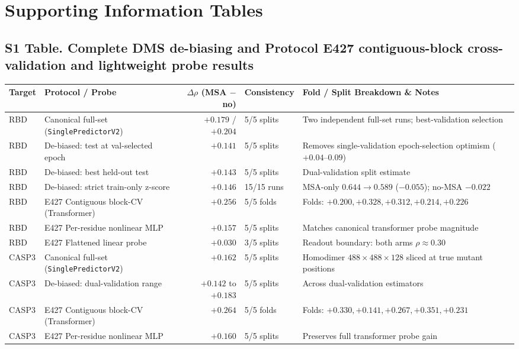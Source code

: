 \documentclass[10pt,a4paper]{article}
\begin{document}
\newpage
\section*{Supporting Information Tables}

\subsection*{S1 Table. Complete DMS de-biasing and Protocol E427 contiguous-block cross-validation and lightweight probe results}
\begin{table}[!ht]
\centering
\footnotesize
\begin{tabularx}{\textwidth}{l l r l Y}
\toprule
\textbf{Target} & \textbf{Protocol / Probe} & \textbf{$\Delta\rho$ (MSA $-$ no)} & \textbf{Consistency} & \textbf{Fold / Split Breakdown \& Notes} \\
\midrule
RBD & Canonical full-set (\texttt{SinglePredictorV2}) & $+0.179$ / $+0.204$ & 5/5 splits & Two independent full-set runs; best-validation selection \\
RBD & De-biased: test at val-selected epoch & $+0.141$ & 5/5 splits & Removes single-validation epoch-selection optimism ($+0.04$--$0.09$) \\
RBD & De-biased: best held-out test & $+0.143$ & 5/5 splits & Dual-validation split estimate \\
RBD & De-biased: strict train-only z-score & $+0.146$ & 15/15 runs & MSA-only $0.644 \rightarrow 0.589$ ($-0.055$); no-MSA $-0.022$ \\
RBD & E427 Contiguous block-CV (Transformer) & $+0.256$ & 5/5 folds & Folds: $+0.200, +0.328, +0.312, +0.214, +0.226$ \\
RBD & E427 Per-residue nonlinear MLP & $+0.157$ & 5/5 splits & Matches canonical transformer probe magnitude \\
RBD & E427 Flattened linear probe & $+0.030$ & 3/5 splits & Readout boundary: both arms $\rho \approx 0.30$ \\
\midrule
CASP3 & Canonical full-set (\texttt{SinglePredictorV2}) & $+0.162$ & 5/5 splits & Homodimer $488 \times 488 \times 128$ sliced at true mutant positions \\
CASP3 & De-biased: dual-validation range & $+0.142$ to $+0.183$ & 5/5 splits & Across dual-validation estimators \\
CASP3 & E427 Contiguous block-CV (Transformer) & $+0.264$ & 5/5 folds & Folds: $+0.330, +0.141, +0.267, +0.351, +0.231$ \\
CASP3 & E427 Per-residue nonlinear MLP & $+0.160$ & 5/5 splits & Preserves full transformer probe gain \\

\end{tabularx}
\end{table}
\end{document}
